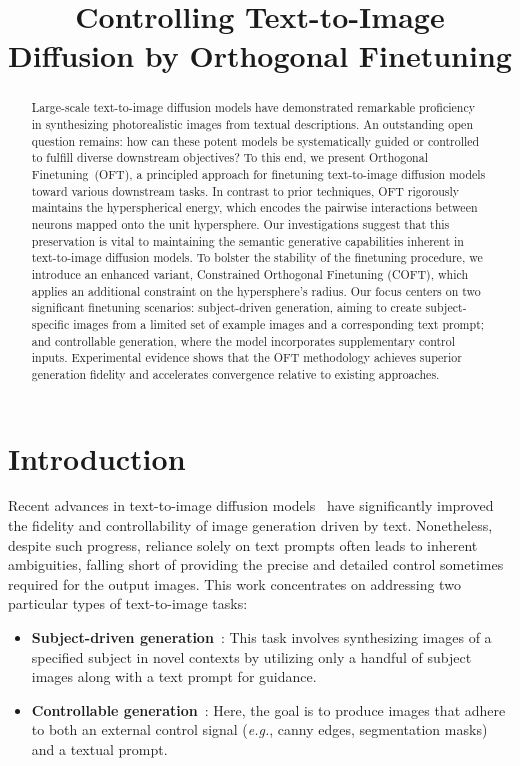 \title{Controlling Text-to-Image Diffusion by Orthogonal Finetuning}

\begin{abstract}
Large-scale text-to-image diffusion models have demonstrated remarkable proficiency in synthesizing photorealistic images from textual descriptions. An outstanding open question remains: how can these potent models be systematically guided or controlled to fulfill diverse downstream objectives? To this end, we present Orthogonal Finetuning~(OFT), a principled approach for finetuning text-to-image diffusion models toward various downstream tasks. In contrast to prior techniques, OFT rigorously maintains the hyperspherical energy, which encodes the pairwise interactions between neurons mapped onto the unit hypersphere. Our investigations suggest that this preservation is vital to maintaining the semantic generative capabilities inherent in text-to-image diffusion models. To bolster the stability of the finetuning procedure, we introduce an enhanced variant, Constrained Orthogonal Finetuning (COFT), which applies an additional constraint on the hypersphere’s radius. Our focus centers on two significant finetuning scenarios: subject-driven generation, aiming to create subject-specific images from a limited set of example images and a corresponding text prompt; and controllable generation, where the model incorporates supplementary control inputs. Experimental evidence shows that the OFT methodology achieves superior generation fidelity and accelerates convergence relative to existing approaches.
\end{abstract}

\section{Introduction}

Recent advances in text-to-image diffusion models~\cite{saharia2022photorealistic,ramesh2022hierarchical,rombach2022high} have significantly improved the fidelity and controllability of image generation driven by text. Nonetheless, despite such progress, reliance solely on text prompts often leads to inherent ambiguities, falling short of providing the precise and detailed control sometimes required for the output images. This work concentrates on addressing two particular types of text-to-image tasks:

\begin{itemize}[leftmargin=*,nosep]

    \item \textbf{Subject-driven generation}~\cite{ruiz2023dreambooth}: This task involves synthesizing images of a specified subject in novel contexts by utilizing only a handful of subject images along with a text prompt for guidance.
    \item \textbf{Controllable generation}~\cite{zhang2023adding,mou2023t2i}: Here, the goal is to produce images that adhere to both an external control signal (\emph{e.g.}, canny edges, segmentation masks) and a textual prompt.
\end{itemize}

